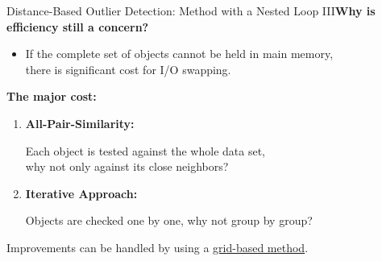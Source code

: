 \begin{frame}{Distance-Based Outlier Detection: Method with a Nested Loop III}\textbf{Why is efficiency still a concern?}
	\begin{itemize}
		\item If the complete set of objects cannot be held in main memory, \\
		      there is significant cost for I/O swapping.
	\end{itemize}
	\textbf{The major cost:}
	\begin{enumerate}
		\item \textcolor{faugray}{\textbf{All-Pair-Similarity:}}

		      Each object is tested against the whole data set, \\
		      why not only against its close neighbors?
		\item \textcolor{faugray}{\textbf{Iterative Approach:}}

		      Objects are checked one by one, why not group by group?
	\end{enumerate}

	Improvements can be handled by using a \underline{grid-based method}.
\end{frame}


